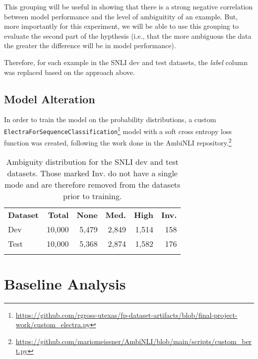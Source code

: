 \documentclass[11pt]{article}
\begin{document}
This grouping will be useful in showing that there is a strong negative correlation between model performance
and the level of ambiguitity of an example. But, more importantly for this experiment, we will be able to use
this grouping to evaluate the second part of the hypthesis (i.e., that the more ambiguous the data
the greater the difference will be in model performance).

Therefore, for each example in the SNLI dev and test datasets, the \textit{label} column was replaced
based on the approach above.

\subsection{Model Alteration}

In order to train the model on the probability distributions, a custom
\texttt{ElectraForSequenceClassification}\footnote{\url{https://github.com/rgross-utexas/fp-dataset-artifacts/blob/final-project-work/custom_electra.py}}
model with a soft cross entropy loss function was created, following the work done in the AmbiNLI repository.\footnote{\url{https://github.com/mariomeissner/AmbiNLI/blob/main/scripts/custom_bert.py}}

\begin{table}
  \begin{tabular}{lrrrrr}
    \Xhline{.8pt}
    \textbf{Dataset} & \textbf{Total} & \textbf{None} & \textbf{Med.} & \textbf{High} & \textbf{Inv.}\\
    \Xhline{.1pt}
     Dev & 10,000 & 5,479 & 2,849 & 1,514 & 158 \\
     Test & 10,000 & 5,368 & 2,874 & 1,582 & 176 \\
    \Xhline{.8pt} 
  \end{tabular}
  \caption{Ambiguity distribution for the SNLI dev and test datasets. Those marked Inv. do not have a single mode
  and are therefore removed from the datasets prior to training.}
\end{table}

\section{Baseline Analysis}
\end{document}
